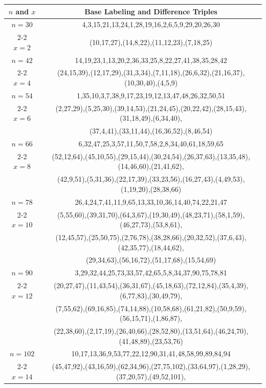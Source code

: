 \begin{tabular}{| c | c |}
\hline
\(n\) and \(x\) & Base Labeling and Difference Triples\\
\hline
\(n=30\) & 
4,3,15,21,13,24,1,28,19,16,2,6,5,9,29,20,26,30\\
\cline{2-2}
\(x=2\)
&(10,17,27),(14,8,22),(11,12,23),(7,18,25)\\
\hline 
\(n=42\) & 
14,19,23,1,13,20,2,36,33,25,8,22,27,41,38,35,28,42\\
\cline{2-2}
\(x=4\)
&(24,15,39),(12,17,29),(31,3,34),(7,11,18),(26,6,32),(21,16,37),(10,30,40),(4,5,9)\\
\hline 
\(n=54\) & 
1,35,10,3,7,38,9,17,23,19,12,13,47,48,26,32,50,51\\
\cline{2-2}
\(x=6\)
&(2,27,29),(5,25,30),(39,14,53),(21,24,45),(20,22,42),(28,15,43),(31,18,49),(6,34,40),\\
&(37,4,41),(33,11,44),(16,36,52),(8,46,54)\\
\hline 
\(n=66\) & 
6,32,47,25,3,57,11,50,7,58,2,8,34,40,61,18,59,65\\
\cline{2-2}
\(x=8\)
&(52,12,64),(45,10,55),(29,15,44),(30,24,54),(26,37,63),(13,35,48),(14,46,60),(21,41,62),\\
&(42,9,51),(5,31,36),(22,17,39),(33,23,56),(16,27,43),(4,49,53),(1,19,20),(28,38,66)\\
\hline 
\(n=78\) & 
26,4,24,7,41,11,9,65,13,33,10,36,14,40,74,22,21,47\\
\cline{2-2}
\(x=10\)
&(5,55,60),(39,31,70),(64,3,67),(19,30,49),(48,23,71),(58,1,59),(46,27,73),(53,8,61),\\
&(12,45,57),(25,50,75),(2,76,78),(38,28,66),(20,32,52),(37,6,43),(42,35,77),(18,44,62),\\
&(29,34,63),(56,16,72),(51,17,68),(15,54,69)\\
\hline 
\(n=90\) & 
3,29,32,44,25,73,33,57,42,65,5,8,34,37,90,75,78,81\\
\cline{2-2}
\(x=12\)
&(20,27,47),(11,43,54),(36,31,67),(45,18,63),(72,12,84),(35,4,39),(6,77,83),(30,49,79),\\
&(7,55,62),(69,16,85),(74,14,88),(10,58,68),(61,21,82),(50,9,59),(56,15,71),(1,86,87),\\
&(22,38,60),(2,17,19),(26,40,66),(28,52,80),(13,51,64),(46,24,70),(41,48,89),(23,53,76)\\
\hline 
\(n=102\) & 
10,17,13,36,9,53,77,22,12,90,31,41,48,58,99,89,84,94\\
\cline{2-2}
\(x=14\)
&(45,47,92),(43,16,59),(62,34,96),(27,75,102),(33,64,97),(1,28,29),(37,20,57),(49,52,101),\\

\end{tabular}
